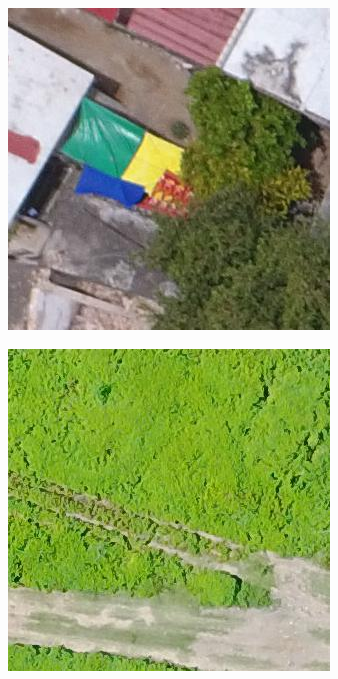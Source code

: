 \begin{figure}[!h]
\begin{subfigure}{.24\textwidth}
    \end{subfigure}
    \begin{subfigure}{.24\textwidth}
        \includegraphics[width=\textwidth]{images/nondamaged3.jpg}
    \end{subfigure}
    \begin{subfigure}{.24\textwidth}
        \includegraphics[width=\textwidth]{images/nondamaged4.jpg}

\end{subfigure}
\end{figure}
